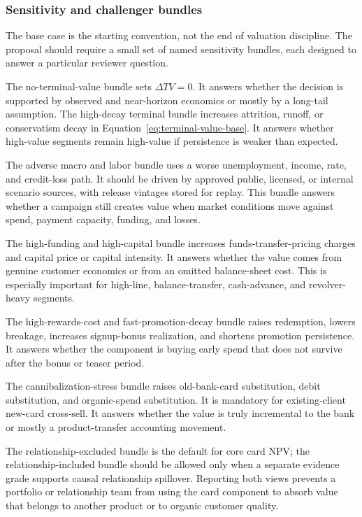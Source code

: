 \documentclass[11pt]{article}
\newcommand{\1}{\mathbf{1}}
\begin{document}
\subsubsection{Sensitivity and challenger bundles}
\label{subsec:valuation-sensitivities}

The base case is the starting convention, not the end of valuation discipline.
The proposal should require a small set of named sensitivity bundles, each
designed to answer a particular reviewer question.

The no-terminal-value bundle sets $\Delta TV=0$. It answers whether the
decision is supported by observed and near-horizon economics or mostly by a
long-tail assumption. The high-decay terminal bundle increases attrition,
runoff, or conservatism decay in Equation~\eqref{eq:terminal-value-base}. It
answers whether high-value segments remain high-value if persistence is weaker
than expected.

The adverse macro and labor bundle uses a worse unemployment, income, rate,
and credit-loss path. It should be driven by approved public, licensed, or
internal scenario sources, with release vintages stored for replay. This
bundle answers whether a campaign still creates value when market conditions
move against spend, payment capacity, funding, and losses.

The high-funding and high-capital bundle increases funds-transfer-pricing
charges and capital price or capital intensity. It answers whether the value
comes from genuine customer economics or from an omitted balance-sheet cost.
This is especially important for high-line, balance-transfer, cash-advance,
and revolver-heavy segments.

The high-rewards-cost and fast-promotion-decay bundle raises redemption,
lowers breakage, increases signup-bonus realization, and shortens promotion
persistence. It answers whether the component is buying early spend that does
not survive after the bonus or teaser period.

The cannibalization-stress bundle raises old-bank-card substitution, debit
substitution, and organic-spend substitution. It is mandatory for
existing-client new-card cross-sell. It answers whether the value is truly
incremental to the bank or mostly a product-transfer accounting movement.

The relationship-excluded bundle is the default for core card NPV; the
relationship-included bundle should be allowed only when a separate evidence
grade supports causal relationship spillover. Reporting both views prevents a
portfolio or relationship team from using the card component to absorb value
that belongs to another product or to organic customer quality.
\end{document}
